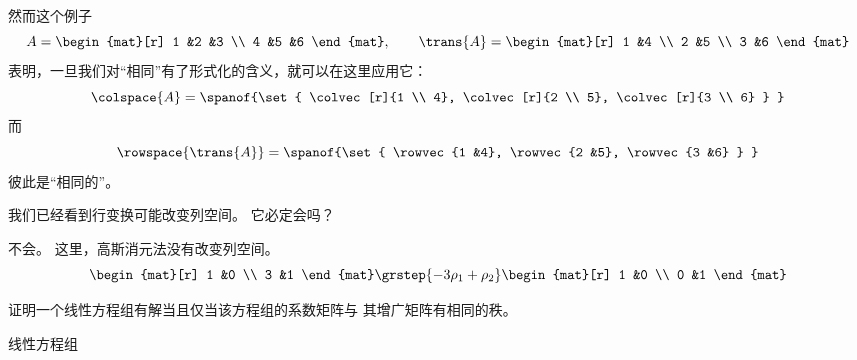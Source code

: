 \begin{exercises}
\begin{answer}
      然而这个例子
      \begin{equation*}
         A=\begin{mat}[r]
             1  &2  &3  \\
             4  &5  &6
           \end{mat},
         \qquad
         \trans{A}=\begin{mat}[r]
             1  &4  \\
             2  &5  \\
             3  &6
           \end{mat}
      \end{equation*}
      表明，一旦我们对“相同”有了形式化的含义，就可以在这里应用它：
      \begin{equation*}
        \colspace{A}=\spanof{\set{
                        \colvec[r]{1 \\ 4},
                        \colvec[r]{2 \\ 5},
                        \colvec[r]{3 \\ 6} }  }
      \end{equation*}
      而
      \begin{equation*}
         \rowspace{\trans{A}}=\spanof{\set{
                                 \rowvec{1 &4},
                                 \rowvec{2 &5},
                                 \rowvec{3 &6} }  }
      \end{equation*}
      彼此是“相同的”。
    \end{answer}
  \recommended \item
    我们已经看到行变换可能改变列空间。
    它必定会吗？
    \begin{answer}
      不会。
      这里，高斯消元法没有改变列空间。
      \begin{equation*}
        \begin{mat}[r]
          1  &0  \\
          3  &1
        \end{mat}
        \grstep{-3\rho_1+\rho_2}
        \begin{mat}[r]
          1  &0  \\
          0  &1
        \end{mat}
      \end{equation*}
    \end{answer}
  \item
    证明一个线性方程组有解当且仅当该方程组的系数矩阵与
    其增广矩阵有相同的秩。
    \begin{answer}
      线性方程组
      \begin{equation*}

\end{equation*}
\end{answer}
\end{exercises}
